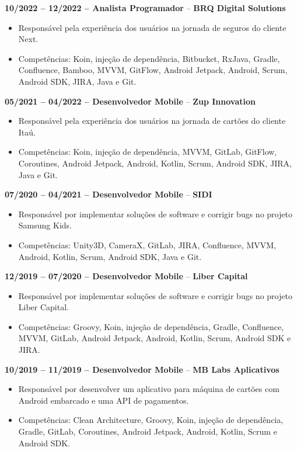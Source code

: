 \documentclass[11pt,a4paper]{article}
\newcommand{\companyname}[1]{\textcolor{secondarycolor}{\textbf{#1}}}
\begin{document}
\smallskip
\textbf{10/2022 -- 12/2022 -- Analista Programador} -- \companyname{BRQ Digital Solutions}
\begin{itemize}
    \item Responsável pela experiência dos usuários na jornada de seguros do cliente Next.
    \item Competências: Koin, injeção de dependência, Bitbucket, RxJava, Gradle, Confluence, Bamboo, MVVM, GitFlow, Android Jetpack, Android, Scrum, Android SDK, JIRA, Java e Git.
\end{itemize}

\smallskip
\textbf{05/2021 -- 04/2022 -- Desenvolvedor Mobile} -- \companyname{Zup Innovation}
\begin{itemize}
    \item Responsável pela experiência dos usuários na jornada de cartões do cliente Itaú.
    \item Competências: Koin, injeção de dependência, MVVM, GitLab, GitFlow, Coroutines, Android Jetpack, Android, Kotlin, Scrum, Android SDK, JIRA, Java e Git.
\end{itemize}

\smallskip
\textbf{07/2020 -- 04/2021 -- Desenvolvedor Mobile} -- \companyname{SIDI}
\begin{itemize}
    \item Responsável por implementar soluções de software e corrigir bugs no projeto Samsung Kids.
    \item Competências: Unity3D, CameraX, GitLab, JIRA, Confluence, MVVM, Android, Kotlin, Scrum, Android SDK, Java e Git.
\end{itemize}

\smallskip
\textbf{12/2019 -- 07/2020 -- Desenvolvedor Mobile} -- \companyname{Liber Capital}
\begin{itemize}
    \item Responsável por implementar soluções de software e corrigir bugs no projeto Liber Capital.
    \item Competências: Groovy, Koin, injeção de dependência, Gradle, Confluence, MVVM, GitLab, Android Jetpack, Android, Kotlin, Scrum, Android SDK e JIRA.
\end{itemize}

\smallskip
\textbf{10/2019 -- 11/2019 -- Desenvolvedor Mobile} -- \companyname{MB Labs Aplicativos}
\begin{itemize}
    \item Responsável por desenvolver um aplicativo para máquina de cartões com Android embarcado e uma API de pagamentos.
    \item Competências: Clean Architecture, Groovy, Koin, injeção de dependência, Gradle, GitLab, Coroutines, Android Jetpack, Android, Kotlin, Scrum e Android SDK.
\end{itemize}
\end{document}
